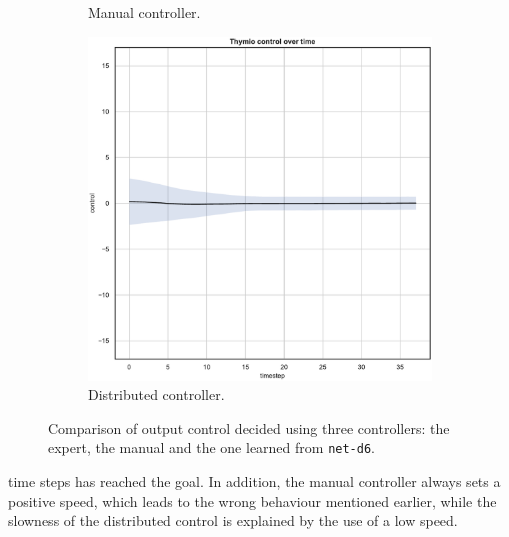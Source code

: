 \begin{figure}[!htb]
\begin{subfigure}[h]{0.3\textwidth}
		\caption{Manual controller.}
	\end{subfigure}
	\hfill
	\begin{subfigure}[h]{0.3\textwidth}
		\centering
		\includegraphics[width=\textwidth]{contents/images/net-d6/control-overtime-learned_distributed}
		\caption{Distributed controller.}
	\end{subfigure}
	\caption[Evaluation of the control decided by \texttt{net-d6}.]{Comparison 
		of output control decided using three controllers: the expert, the manual 
		and the one learned from \texttt{net-d6}.}
	\label{fig:net-d6control}
\end{figure}

\noindent
time steps has reached the goal. 
In addition, the manual controller always sets a positive speed, which leads to the 
wrong behaviour mentioned earlier, while the slowness of the distributed 
control is explained by the use of a low speed.

